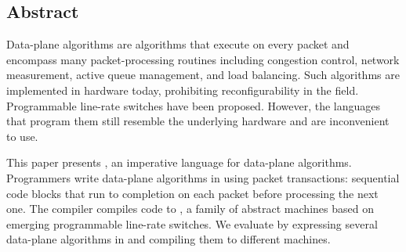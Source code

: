 \subsection*{Abstract}
Data-plane algorithms are algorithms that execute on every packet and encompass
many packet-processing routines including congestion control, network
measurement, active queue management, and load balancing. Such algorithms are
implemented in hardware today, prohibiting reconfigurability in the field.
Programmable line-rate switches have been proposed. However, the languages that
program them still resemble the underlying hardware and are inconvenient to use.

This paper presents \pktlanguage, an imperative language for data-plane
algorithms. Programmers write data-plane algorithms in \pktlanguage using
packet transactions: sequential code blocks that run to completion on each
packet before processing the next one. The \pktlanguage compiler compiles
\pktlanguage code to \absmachine, a family of abstract machines based on
emerging programmable line-rate switches.  We evaluate \pktlanguage by
expressing several data-plane algorithms in \pktlanguage and compiling them to
different \absmachine machines.
